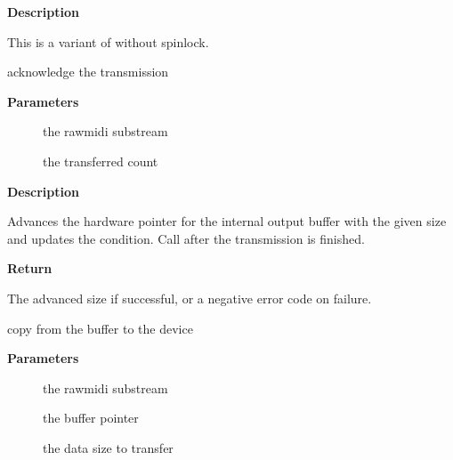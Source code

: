 \documentclass[a4paper,8pt,english]{sphinxmanual}
\begin{document}
\textbf{Description}

This is a variant of  without spinlock.

\begin{fulllineitems}
\label{sound/kernel-api/alsa-driver-api:c.snd_rawmidi_transmit_ack}
acknowledge the transmission

\end{fulllineitems}


\textbf{Parameters}
\begin{description}
\item[{}] \leavevmode
the rawmidi substream

\item[{}] \leavevmode
the transferred count

\end{description}

\textbf{Description}

Advances the hardware pointer for the internal output buffer with
the given size and updates the condition.
Call after the transmission is finished.

\textbf{Return}

The advanced size if successful, or a negative error code on failure.

\begin{fulllineitems}
\label{sound/kernel-api/alsa-driver-api:c.snd_rawmidi_transmit}
copy from the buffer to the device

\end{fulllineitems}


\textbf{Parameters}
\begin{description}
\item[{}] \leavevmode
the rawmidi substream

\item[{}] \leavevmode
the buffer pointer

\item[{}] \leavevmode
the data size to transfer

\end{description}
\end{document}
